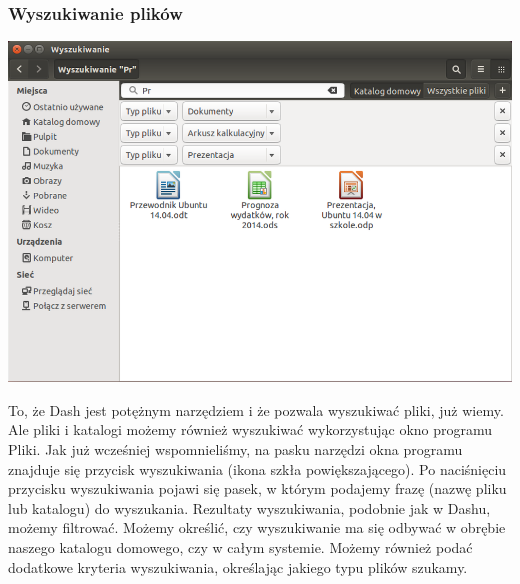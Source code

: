 \subsubsection{Wyszukiwanie plików}
\begin{center}
	\includegraphics[width=\linewidth]{images/programy_nautilus2.png}
\end{center}

To, że Dash jest potężnym narzędziem i że pozwala wyszukiwać pliki, już wiemy. Ale pliki i katalogi możemy również wyszukiwać wykorzystując okno programu Pliki. Jak już wcześniej wspomnieliśmy, na pasku narzędzi okna programu znajduje się przycisk wyszukiwania (ikona szkła powiększającego). Po naciśnięciu przycisku wyszukiwania pojawi się pasek, w którym podajemy frazę (nazwę pliku lub katalogu) do wyszukania. Rezultaty wyszukiwania, podobnie jak w Dashu, możemy filtrować. Możemy określić, czy wyszukiwanie ma się odbywać w obrębie naszego katalogu domowego, czy w całym systemie. Możemy również podać dodatkowe kryteria wyszukiwania, określając jakiego typu plików szukamy.

